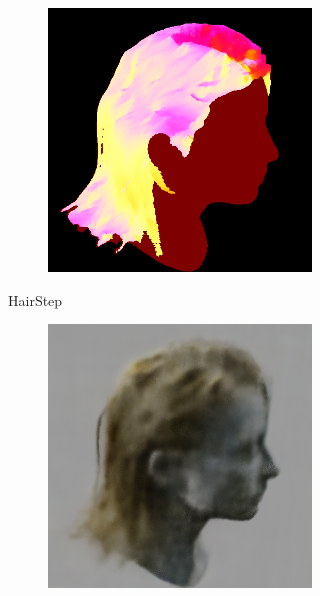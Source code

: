 \documentclass{article}
\begin{document}
\begin{figure}[h]
\begin{subfigure}{0.48\linewidth}
\begin{subfigure}{0.48\textwidth}
            \includegraphics[width=\textwidth]{./images/baseline-method/test_6_hairstep.png}
        \end{subfigure}
        \caption{HairStep}
    \end{subfigure}
    \hfill
    \begin{subfigure}{0.48\linewidth}
        \begin{subfigure}{0.48\textwidth}
            \centering
            \includegraphics[width=\textwidth]{./images/baseline-method/pred_6_nerf.png}

\end{subfigure}
\end{subfigure}
\end{figure}
\end{document}

